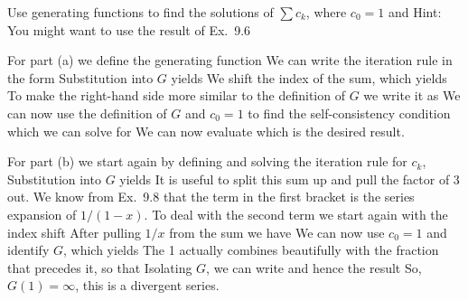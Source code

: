 
Use generating functions to find the solutions of $\sum c_k$, where
$c_0=1$ and 
Hint: You might want to use the result of Ex.~9.6

\solution 
For part (a) we define the generating function
We can write the iteration rule in the form 
Substitution into $G$ yields 
We shift the index of the sum, which yields
To make the right-hand side more similar to the definition of $G$ we write it as  
We can now use the definition of $G$ and $c_0=1$ to find the self-consistency condition
which we can solve for
We can now evaluate
which is the desired result. 

For part (b) we start again by defining 
and solving the iteration rule for $c_k$,
Substitution into $G$ yields
It is useful to split this sum up and pull the factor of 3 out. 
We know from Ex.~9.8 that the term in the first bracket is the series expansion of $1/(1-x)$. To deal with the second term we start again with the index shift
After pulling $1/x$ from the sum we have
We can now use $c_0=1$ and identify $G$, which yields
The 1 actually combines beautifully with the fraction that precedes it, so that 
Isolating $G$, we can write
and hence the result 
So, $G(1)=\infty$, this is a divergent series. 
\solutionend
